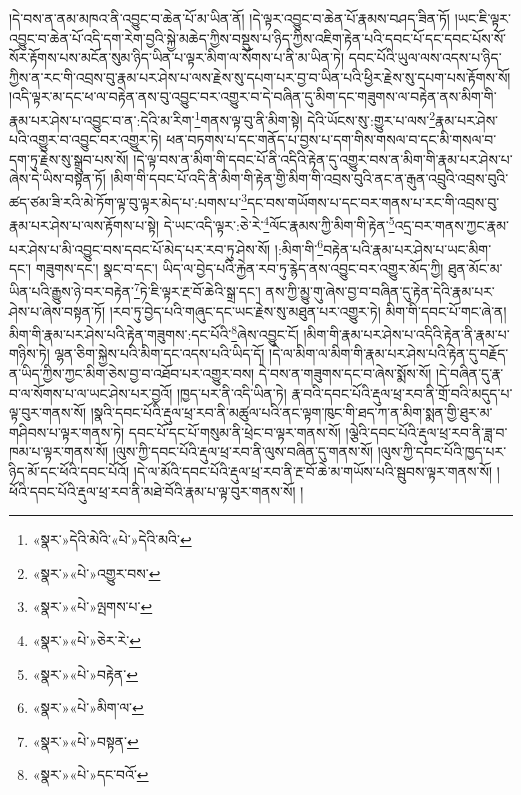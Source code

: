 །དེ་བས་ན་ནམ་མཁའ་ནི་འབྱུང་བ་ཆེན་པོ་མ་ཡིན་ནོ། །དེ་ལྟར་འབྱུང་བ་ཆེན་པོ་རྣམས་བཤད་ཟིན་ཏོ། །ཡང་ཇི་ལྟར་འབྱུང་བ་ཆེན་པོ་འདི་དག་རེག་བྱའི་སྐྱེ་མཆེད་ཀྱིས་བསྡུས་པ་ཉིད་ཀྱིས་འཇིག་རྟེན་པའི་དབང་པོ་དང་དབང་པོས་སོ་སོར་རྟོགས་པས་མངོན་སུམ་ཉིད་ཡིན་པ་ལྟར་མིག་ལ་སོགས་པ་ནི་མ་ཡིན་ཏེ། དབང་པོའི་ཡུལ་ལས་འདས་པ་ཉིད་ཀྱིས་ན་རང་གི་འབྲས་བུ་རྣམ་པར་ཤེས་པ་ལས་རྗེས་སུ་དཔག་པར་བྱ་བ་ཡིན་པའི་ཕྱིར་རྗེས་སུ་དཔག་པས་རྟོགས་སོ། །འདི་ལྟར་མ་དང་ཕ་ལ་བརྟེན་ནས་བུ་འབྱུང་བར་འགྱུར་བ་དེ་བཞིན་དུ་མིག་དང་གཟུགས་ལ་བརྟེན་ནས་མིག་གི་རྣམ་པར་ཤེས་པ་འབྱུང་བ་ན་:དེའི་མ་རིག་\footnote{«སྣར་»དེའི་མེའི་«པེ་»དེའི་མའི་}གནས་ལྟ་བུ་ནི་མིག་སྟེ། དེའི་ཡོངས་སུ་:གྱུར་པ་ལས་\footnote{«སྣར་»«པེ་»འགྱུར་བས་}རྣམ་པར་ཤེས་པའི་འགྱུར་བ་འབྱུང་བར་འགྱུར་ཏེ། ཕན་བཏགས་པ་དང་གནོད་པ་བྱས་པ་དག་གིས་གསལ་བ་དང་མི་གསལ་བ་དག་ཏུ་རྗེས་སུ་སྒྲུབ་པས་སོ། །དེ་ལྟ་བས་ན་མིག་གི་དབང་པོ་ནི་འདིའི་རྟེན་དུ་འགྱུར་བས་ན་མིག་གི་རྣམ་པར་ཤེས་པ་ཞེས་དེ་ཡིས་བསྟན་ཏོ། །མིག་གི་དབང་པོ་འདི་ནི་མིག་གི་རྟེན་གྱི་མིག་གི་འབྲས་བུའི་ནང་ན་རྒུན་འབྲུའི་འབྲས་བུའི་ཚད་ཙམ་ཟི་རའི་མེ་ཏོག་ལྟ་བུ་ལྟར་མེད་པ་:པགས་པ་\footnote{«སྣར་»«པེ་»ལྤགས་པ་}དང་བས་གཡོགས་པ་དང་བར་གནས་པ་རང་གི་འབྲས་བུ་རྣམ་པར་ཤེས་པ་ལས་རྟོགས་པ་སྟེ། དེ་ཡང་འདི་ལྟར་:ཅེ་རེ་\footnote{«སྣར་»«པེ་»ཅེར་རེ་}ལོང་རྣམས་ཀྱི་མིག་གི་རྟེན་\footnote{«སྣར་»«པེ་»བརྟེན་}འདྲ་བར་གནས་ཀྱང་རྣམ་པར་ཤེས་པ་མི་འབྱུང་བས་དབང་པོ་མེད་པར་རབ་ཏུ་ཤེས་སོ། །:མིག་གི་\footnote{«སྣར་»«པེ་»མིག་ལ་}བརྟེན་པའི་རྣམ་པར་ཤེས་པ་ཡང་མིག་དང་། གཟུགས་དང་། སྣང་བ་དང་། ཡིད་ལ་བྱེད་པའི་རྐྱེན་རབ་ཏུ་རྙེད་ནས་འབྱུང་བར་འགྱུར་མོད་ཀྱི། ཐུན་མོང་མ་ཡིན་པའི་རྒྱུས་ཉེ་བར་བརྟེན་\footnote{«སྣར་»«པེ་»བསྟན་}ཏེ་ཇི་ལྟར་རྔ་བོ་ཆེའི་སྒྲ་དང་། ནས་ཀྱི་མྱུ་གུ་ཞེས་བྱ་བ་བཞིན་དུ་རྟེན་དེའི་རྣམ་པར་ཤེས་པ་ཞེས་བསྟན་ཏོ། །རབ་ཏུ་བྱེད་པའི་གཞུང་དང་ཡང་རྗེས་སུ་མཐུན་པར་འགྱུར་ཏེ། མིག་གི་དབང་པོ་གང་ཞེ་ན། མིག་གི་རྣམ་པར་ཤེས་པའི་རྟེན་གཟུགས་:དང་པོའི་\footnote{«སྣར་»«པེ་»དང་བའོ་}ཞེས་འབྱུང་ངོ། །མིག་གི་རྣམ་པར་ཤེས་པ་འདིའི་རྟེན་ནི་རྣམ་པ་གཉིས་ཏེ། ལྷན་ཅིག་སྐྱེས་པའི་མིག་དང་འདས་པའི་ཡིད་དོ། །དེ་ལ་མིག་ལ་མིག་གི་རྣམ་པར་ཤེས་པའི་རྟེན་དུ་བརྗོད་ན་ཡིད་ཀྱིས་ཀྱང་མིག་ཅེས་བྱ་བ་འཐོབ་པར་འགྱུར་བས། དེ་བས་ན་གཟུགས་དང་བ་ཞེས་སྨོས་སོ། །དེ་བཞིན་དུ་རྣ་བ་ལ་སོགས་པ་ལ་ཡང་ཤེས་པར་བྱའོ། །ཁྱད་པར་ནི་འདི་ཡིན་ཏེ། རྣ་བའི་དབང་པོའི་རྡུལ་ཕྲ་རབ་ནི་གྲོ་བའི་མདུད་པ་ལྟ་བུར་གནས་སོ། །སྣའི་དབང་པོའི་རྡུལ་ཕྲ་རབ་ནི་མཚུལ་པའི་ནང་ལྟག་ཁུང་གི་ཐད་ཀ་ན་མིག་སྨན་གྱི་ཐུར་མ་གཤིབས་པ་ལྟར་གནས་ཏེ། དབང་པོ་དང་པོ་གསུམ་ནི་ཕྲེང་བ་ལྟར་གནས་སོ། །ལྕེའི་དབང་པོའི་རྡུལ་ཕྲ་རབ་ནི་ཟླ་བ་ཁམ་པ་ལྟར་གནས་སོ། །ལུས་ཀྱི་དབང་པོའི་རྡུལ་ཕྲ་རབ་ནི་ལུས་བཞིན་དུ་གནས་སོ། །ལུས་ཀྱི་དབང་པོའི་ཁྱད་པར་ཉིད་མོ་དང་ཕོའི་དབང་པོའོ། །དེ་ལ་མོའི་དབང་པོའི་རྡུལ་ཕྲ་རབ་ནི་རྔ་བོ་ཆེ་མ་གཡོས་པའི་སྦུབས་ལྟར་གནས་སོ། །ཕོའི་དབང་པོའི་རྡུལ་ཕྲ་རབ་ནི་མཐེ་བོའི་རྣམ་པ་ལྟ་བུར་གནས་སོ། །

